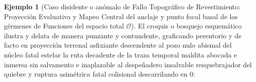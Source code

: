 \documentclass[11pt,a4paper]{article}
\theoremstyle{definition}
\newtheorem{ejemplo}{Ejemplo}[section]
\theoremstyle{remark}
\numberwithin{equation}{section}
\begin{document}
\begin{ejemplo}[Caso disidente o anómalo de Fallo Topográfico de Revestimiento: Proyección Evaluativa y Mapeo Central del anclaje y punto focal basal de los gérmenes de Funciones del espacio total $\mathcal{O}$]
El croquis o bosquejo esquemático ilustra y delata de manera punzante y contundente, graficando perentorio y de facto en proyección terrenal asfixiante descendente al pozo nulo abismal del núcleo fatal estelar la ruta decadente de la traza temporal maldita abocada e inmersa sin salvamento e inaplazable al despeñadero insalvable resquebrajador del quiebre y ruptura asimétrica fatal colisional descarrilando en $0$:
\begin{center}
\end{center}
\end{ejemplo}
\end{document}
